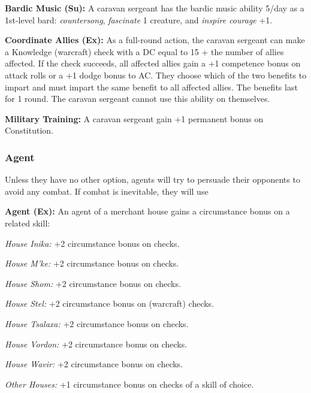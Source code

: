 \textbf{Bardic Music (Su):} A caravan sergeant has the bardic music ability 5/day as a 1st-level bard: \emph{countersong}, \emph{fascinate} 1 creature, and \emph{inspire courage} +1.

\textbf{Coordinate Allies (Ex):} As a full-round action, the caravan sergeant can make a Knowledge (warcraft) check with a DC equal to 15 + the number of allies affected. If the check succeeds, all affected allies gain a +1 competence bonus on attack rolls or a +1 dodge bonus to AC. They choose which of the two benefits to impart and must impart the same benefit to all affected allies. The benefits last for 1 round. The caravan sergeant cannot use this ability on themselves.

\textbf{Military Training:} A caravan sergeant gain +1 permanent bonus on Constitution.


\subsubsection{Agent}

Unless they have no other option, agents will try to persuade their opponents to avoid any combat. If combat is inevitable, they will use 

\textbf{Agent (Ex):} An agent of a merchant house gains a circumstance bonus on a related skill:

\textit{House Inika:} +2 circumstance bonus on  checks.

\textit{House M'ke:} +2 circumstance bonus on  checks.

\textit{House Shom:} +2 circumstance bonus on  checks.

\textit{House Stel:} +2 circumstance bonus on  (warcraft) checks.

\textit{House Tsalaxa:} +2 circumstance bonus on  checks.

\textit{House Vordon:} +2 circumstance bonus on  checks.

\textit{House Wavir:} +2 circumstance bonus on  checks.

\textit{Other Houses:} +1 circumstance bonus on checks of a skill of choice.

